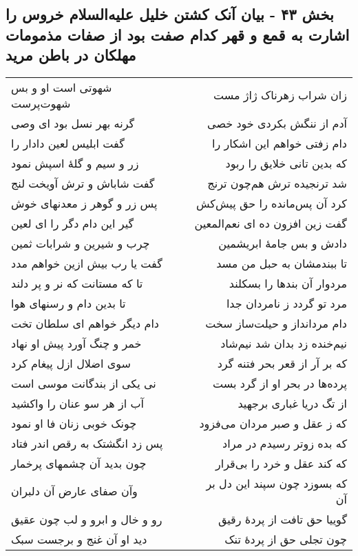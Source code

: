 \begin{center}
\section*{بخش ۴۳ - بیان آنک کشتن خلیل علیه‌السلام خروس را اشارت به قمع و قهر کدام  صفت بود از صفات مذمومات مهلکان در باطن مرید}
\label{sec:sh043}
\begin{longtable}{l p{0.5cm} r}
شهوتی است او و بس شهوت‌پرست
&&
زان شراب زهرناک ژاژ مست
\\
گرنه بهر نسل بود ای وصی
&&
آدم از ننگش بکردی خود خصی
\\
گفت ابلیس لعین دادار را
&&
دام زفتی خواهم این اشکار را
\\
زر و سیم و گلهٔ اسپش نمود
&&
که بدین تانی خلایق را ربود
\\
گفت شاباش و ترش آویخت لنج
&&
شد ترنجیده ترش هم‌چون ترنج
\\
پس زر و گوهر ز معدنهای خوش
&&
کرد آن پس‌مانده را حق پیش‌کش
\\
گیر این دام دگر را ای لعین
&&
گفت زین افزون ده ای نعم‌المعین
\\
چرب و شیرین و شرابات ثمین
&&
دادش و بس جامهٔ ابریشمین
\\
گفت یا رب بیش ازین خواهم مدد
&&
تا ببندمشان به حبل من مسد
\\
تا که مستانت که نر و پر دلند
&&
مردوار آن بندها را بسکلند
\\
تا بدین دام و رسنهای هوا
&&
مرد تو گردد ز نامردان جدا
\\
دام دیگر خواهم ای سلطان تخت
&&
دام مردانداز و حیلت‌ساز سخت
\\
خمر و چنگ آورد پیش او نهاد
&&
نیم‌خنده زد بدان شد نیم‌شاد
\\
سوی اضلال ازل پیغام کرد
&&
که بر آر از قعر بحر فتنه گرد
\\
نی یکی از بندگانت موسی است
&&
پرده‌ها در بحر او از گرد بست
\\
آب از هر سو عنان را واکشید
&&
از تگ دریا غباری برجهید
\\
چونک خوبی زنان فا او نمود
&&
که ز عقل و صبر مردان می‌فزود
\\
پس زد انگشتک به رقص اندر فتاد
&&
که بده زوتر رسیدم در مراد
\\
چون بدید آن چشمهای پرخمار
&&
که کند عقل و خرد را بی‌قرار
\\
وآن صفای عارض آن دلبران
&&
که بسوزد چون سپند این دل بر آن
\\
رو و خال و ابرو و لب چون عقیق
&&
گوییا حق تافت از پردهٔ رقیق
\\
دید او آن غنج و برجست سبک
&&
چون تجلی حق از پردهٔ تنک
\\
\end{longtable}
\end{center}
